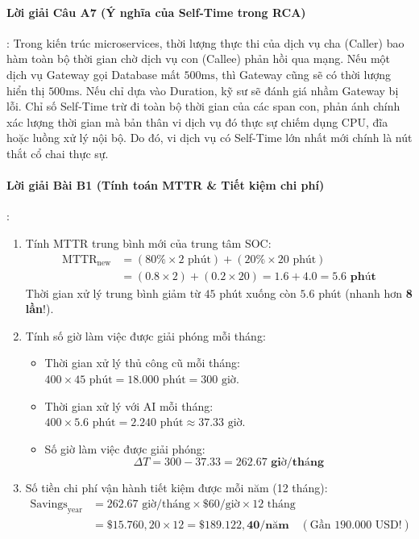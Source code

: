 \paragraph{Lời giải Câu A7 (Ý nghĩa của Self-Time trong RCA)}:
Trong kiến trúc microservices, thời lượng thực thi của dịch vụ cha (Caller) bao hàm toàn bộ thời gian chờ dịch vụ con (Callee) phản hồi qua mạng. Nếu một dịch vụ Gateway gọi Database mất $500\text{ms}$, thì Gateway cũng sẽ có thời lượng hiển thị $500\text{ms}$. Nếu chỉ dựa vào Duration, kỹ sư sẽ đánh giá nhầm Gateway bị lỗi.
Chỉ số Self-Time trừ đi toàn bộ thời gian của các span con, phản ánh chính xác lượng thời gian mà bản thân vi dịch vụ đó thực sự chiếm dụng CPU, đĩa hoặc luồng xử lý nội bộ. Do đó, vi dịch vụ có Self-Time lớn nhất mới chính là nút thắt cổ chai thực sự.

\paragraph{Lời giải Bài B1 (Tính toán MTTR \& Tiết kiệm chi phí)}:
\begin{enumerate}
  \item Tính MTTR trung bình mới của trung tâm SOC:
  \begin{align*}
  \text{MTTR}_{\text{new}} &= (80\% \times 2 \text{ phút}) + (20\% \times 20 \text{ phút}) \\
  &= (0.8 \times 2) + (0.2 \times 20) = 1.6 + 4.0 = \mathbf{5.6 \text{ phút}}
  \end{align*}
  Thời gian xử lý trung bình giảm từ $45$ phút xuống còn $5.6$ phút (nhanh hơn \textbf{8 lần}!).
  \item Tính số giờ làm việc được giải phóng mỗi tháng:
  \begin{itemize}
    \item Thời gian xử lý thủ công cũ mỗi tháng: $400 \times 45 \text{ phút} = 18.000 \text{ phút} = 300 \text{ giờ}$.
    \item Thời gian xử lý với AI mỗi tháng: $400 \times 5.6 \text{ phút} = 2.240 \text{ phút} \approx 37.33 \text{ giờ}$.
    \item Số giờ làm việc được giải phóng:
    \begin{equation*}
    \Delta T = 300 - 37.33 = \mathbf{262.67 \text{ giờ/tháng}}
    \end{equation*}
  \end{itemize}
  \item Số tiền chi phí vận hành tiết kiệm được mỗi năm (12 tháng):
  \begin{align*}
  \text{Savings}_{\text{year}} &= 262.67 \text{ giờ/tháng} \times \$60\text{/giờ} \times 12 \text{ tháng} \\
  &= \$15.760,20 \times 12 = \mathbf{\$189.122,40\text{/năm}} \quad (\text{Gần 190.000 USD!})
  \end{align*}
\end{enumerate}

